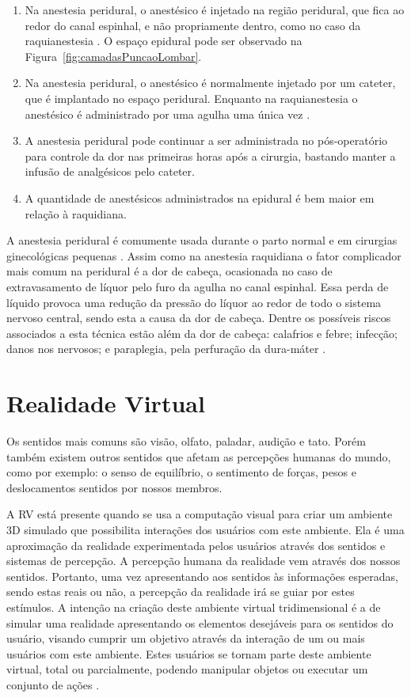 \begin{enumerate}
  \item Na anestesia peridural, o anestésico é injetado na região peridural, que fica ao redor do canal espinhal, e não propriamente dentro, como no caso da raquianestesia \cite{Raj1988}. O espaço epidural pode ser observado na Figura~\ref{fig:camadasPuncaoLombar}.
  \item Na anestesia peridural, o anestésico é normalmente injetado por um cateter, que é implantado no espaço peridural. Enquanto na raquianestesia o anestésico é administrado por uma agulha uma única vez \cite{Raj1988}.
  \item A anestesia peridural pode continuar a ser administrada no pós-operatório para controle da dor nas primeiras horas após a cirurgia, bastando manter a infusão de analgésicos pelo cateter.
  \item A quantidade de anestésicos administrados na epidural é bem maior em relação à raquidiana.
\end{enumerate}

A anestesia peridural é comumente usada durante o parto normal e em cirurgias ginecológicas pequenas \cite{Raj1988}.
Assim como na anestesia raquidiana o fator complicador mais comum na peridural é a dor de cabeça, ocasionada no caso de extravasamento de líquor pelo furo da agulha no canal espinhal. Essa perda de líquido provoca uma redução da pressão do líquor ao redor de todo o sistema nervoso central, sendo esta a causa da dor de cabeça. Dentre os possíveis riscos associados a esta técnica estão além da dor de cabeça: calafrios e febre; infecção; danos nos nervosos; e paraplegia, pela perfuração da dura-máter \cite{Horlocker1997}.

\section{Realidade Virtual}

Os sentidos mais comuns são visão, olfato, paladar, audição e tato. Porém também existem outros sentidos que afetam as percepções humanas do mundo, como por exemplo: o senso de equilíbrio, o sentimento de forças, pesos e deslocamentos sentidos por nossos membros. 

A \acrfull{RV} está presente quando se usa a computação visual para criar um ambiente 3D simulado que possibilita interações dos usuários com este ambiente. Ela é uma aproximação da realidade experimentada pelos usuários através dos sentidos e sistemas de percepção. A percepção humana da realidade vem através dos nossos sentidos. Portanto, uma vez apresentando aos sentidos às informações esperadas, sendo estas reais ou não, a percepção da realidade irá se guiar por estes estímulos.
A intenção na criação deste ambiente virtual tridimensional é a de simular uma realidade apresentando os elementos desejáveis para os sentidos do usuário, visando cumprir um objetivo através da interação de um ou mais usuários com este ambiente. Estes usuários se tornam parte deste ambiente virtual, total ou parcialmente, podendo manipular objetos ou executar um conjunto de ações \cite{Hughes2013}.


